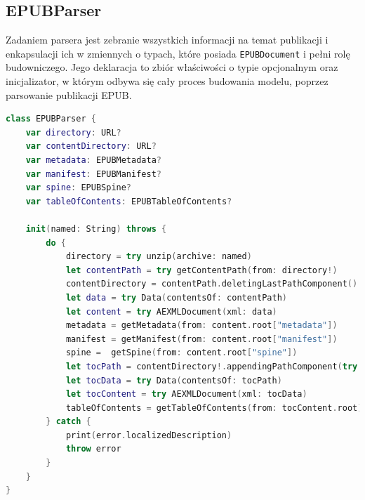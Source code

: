 \subsection{EPUBParser}

Zadaniem parsera jest zebranie wszystkich informacji na temat publikacji i enkapsulacji ich w zmiennych o typach, które posiada \texttt{EPUBDocument} i pełni rolę budowniczego. Jego deklaracja to zbiór właściwości o typie opcjonalnym oraz inicjalizator, w którym odbywa się cały proces budowania modelu, poprzez parsowanie publikacji EPUB.

\begin{lstlisting}[caption={Klasa EPUBParser}, language=swift,label={EPUBParser-declaration}]
class EPUBParser {
    var directory: URL?
    var contentDirectory: URL?
    var metadata: EPUBMetadata?
    var manifest: EPUBManifest?
    var spine: EPUBSpine?
    var tableOfContents: EPUBTableOfContents?

    init(named: String) throws {
        do {
            directory = try unzip(archive: named)
            let contentPath = try getContentPath(from: directory!)
            contentDirectory = contentPath.deletingLastPathComponent()
            let data = try Data(contentsOf: contentPath)
            let content = try AEXMLDocument(xml: data)
            metadata = getMetadata(from: content.root["metadata"])
            manifest = getManifest(from: content.root["manifest"])
            spine =  getSpine(from: content.root["spine"])
            let tocPath = contentDirectory!.appendingPathComponent(try manifest!.path(forItemWithId: spine?.toc ?? ""))
            let tocData = try Data(contentsOf: tocPath)
            let tocContent = try AEXMLDocument(xml: tocData)
            tableOfContents = getTableOfContents(from: tocContent.root)
        } catch {
            print(error.localizedDescription)
            throw error
        }
    }
}
\end{lstlisting}

